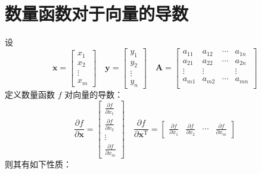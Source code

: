 \documentclass[UTF8,space=auto]{ctexart} %
\begin{document}
\section{数量函数对于向量的导数}
设
\[
\mathbf{x} =
\begin{bmatrix}
x_1 \\ x_2 \\ \vdots \\ x_m
\end{bmatrix}\quad
\mathbf{y} =
\begin{bmatrix}
	y_1 \\ y_2 \\ \vdots \\ y_n
\end{bmatrix}\quad
\mathbf{A} =
\begin{bmatrix}
	a_{11} & a_{12} & \cdots & a_{1n} \\
	a_{21} & a_{22} & \cdots & a_{2n} \\
	\vdots & \vdots & & \vdots \\
	a_{m1} & a_{m2} & \cdots & a_{mn} \\
\end{bmatrix}
\]
定义数量函数 $ f $ 对向量的导数：
\[
\frac{\partial f}{\partial \mathbf{x}}
= \begin{bmatrix}
	\frac{\partial f}{\partial x_1} \\
	\frac{\partial f}{\partial x_2} \\
	\vdots \\
	\frac{\partial f}{\partial x_m}
\end{bmatrix}\quad
\frac{\partial f}{\partial \mathbf{x}^{\mathrm{T}}} = \begin{bmatrix}
	\frac{\partial f}{\partial x_1} &
	\frac{\partial f}{\partial x_2} &
	\cdots &
	\frac{\partial f}{\partial x_m}
\end{bmatrix}
\]
则其有如下性质：
\end{document}
